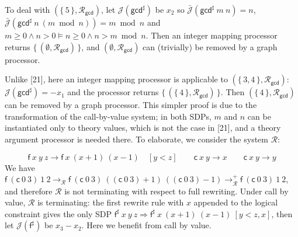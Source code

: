 \documentclass[10pt,a4paper]{amsart}
\begin{document}
 
 
 
To deal with $(\{\,\text{5}\,\},\mathcal{R}_{\mathsf{gcd}})$, let $\mathcal{J}(\mathsf{gcd}^{\sharp})$ be $x_{2}$ so $\bar{\mathcal{J}}({{\mathsf{gcd}^{\sharp}}\ {m}}\ {n})=n$, $\bar{\mathcal{J}}({{\mathsf{gcd}^{\sharp}}\ {n}}\ {(m\bmod n)})=m\bmod n$ and $m\geq 0\wedge n>0\models n\geq 0\wedge n>m\bmod n$. Then an integer mapping processor returns $\{\,(\emptyset,\mathcal{R}_{\mathsf{gcd}})\,\}$, and $(\emptyset,\mathcal{R}_{\mathsf{gcd}})$ can (trivially) be removed by a graph processor.\par
 
 
 
Unlike [21], here an integer mapping processor is applicable to $(\{\,\text{3},\text{4}\,\},\mathcal{R}_{\mathsf{gcd}})$: $\mathcal{J}(\mathsf{gcd}^{\sharp})={-x_{1}}$ and the processor returns $\{\,(\{\,\text{4}\,\},\mathcal{R}_{\mathsf{gcd}})\,\}$. Then $(\{\,\text{4}\,\},\mathcal{R}_{\mathsf{gcd}})$ can be removed by a graph processor. This simpler proof is due to the transformation of the call-by-value system; in both SDPs, $m$ and $n$ can be instantiated only to theory values, which is not the case in [21], and a theory argument processor is needed there. To elaborate, we consider the system $\mathcal{R}$:\par
    \[{{{\mathsf{f}}\ {x}}\ {y}}\ {z}\rightarrow{{{\mathsf{f}}\ {x}}\ {(x+1)}}\ {(x-1)}\quad[y<z]\qquad{{\mathsf{c}}\ {x}}\ {y}\rightarrow x\qquad{{\mathsf{c}}\ {x}}\ {y}\rightarrow y\]    
We have ${{{\mathsf{f}}\ {({{\mathsf{c}}\ {0}}\ {3})}}\ {1}}\ {2}\rightarrow_{\mathcal{R}}{{{\mathsf{f}}\ {({{\mathsf{c}}\ {0}}\ {3})}}\ {(({{\mathsf{c}}\ {0}}\ {3})+1)}}\ {(({{\mathsf{c}}\ {0}}\ {3})-1)}\rightarrow_{\mathcal{R}}^{+}{{{\mathsf{f}}\ {({{\mathsf{c}}\ {0}}\ {3})}}\ {1}}\ {2}$, and therefore $\mathcal{R}$ is not terminating with respect to full rewriting. Under call by value, $\mathcal{R}$ is terminating: the first rewrite rule with $x$ appended to the logical constraint gives the only SDP ${{{{\mathsf{f}^{\sharp}}\ {x}}\ {y}}\ {z}}\Rightarrow{{{{\mathsf{f}^{\sharp}}\ {x}}\ {(x+1)}}\ {(x-1)}}\ [y<z,x]$, then let $\mathcal{J}(\mathsf{f}^{\sharp})$ be $x_{3}-x_{2}$. Here we benefit from call by value.\par
 
 
\end{document}
